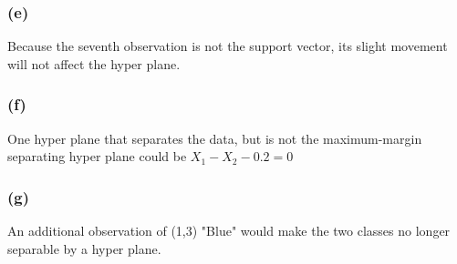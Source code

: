 \documentclass[12pt]{article}
\begin{document}
{\subsubsection*{(e)}
Because the seventh observation is not the support vector, its slight movement will not affect the hyper plane. 

\subsubsection*{(f)}
One hyper plane that separates the data, but is not the maximum-margin separating hyper plane could be $X_{1}-X_{2}-0.2 =0 $

\subsubsection*{(g)}
An additional observation of (1,3) "Blue" would make the two classes no longer separable by a hyper plane.
}
\end{document}
